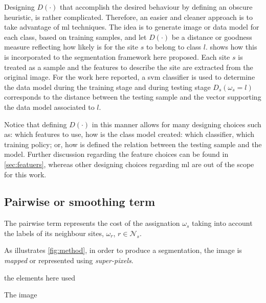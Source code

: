 Designing $D(\cdot)$ that accomplish the desired behaviour by defining an obscure heuristic, is rather complicated. 
Therefore, an easier and cleaner approach is to take advantage of \ac{ml} techniques. 
The idea is to generate image or data model for each class, based on training samples, and let $D(\cdot)$ be a distance or goodness measure reflecting how likely is for the site $s$ to belong to class $l$.
 shows how this is incorporated to the segmentation framework here proposed.
Each site $s$ is treated as a sample and the features to describe the site are extracted from the original image. 
For the work here reported, a \ac{svm} classifier is used to determine the data model during the training stage and during testing stage $D_s(\omega_s=l)$ corresponds to the distance between the testing sample and the vector supporting the data model associated to $l$. 

Notice that defining $D(\cdot)$ in this manner allows for many designing choices such as: which features to use, how is the class model created: which classifier, which training policy; or, how is defined the relation between the testing sample and the model.
Further discussion regarding the feature choices can be found in \cref{sec:featuers}, whereas other designing choices regarding \ac{ml} are out of the scope for this work.

\subsection{Pairwise or smoothing term} \label{sec:method:mrfTerm}
 
The pairwise term represents the cost of the assignation $\omega_s$ taking into account the labels of its neighbour sites, $\omega_r$, $r \in \mathcal{N}_{s}$. 

As illustrates \cref{fig:method}, in order to produce a segmentation, the image is \emph{mapped} or represented using \emph{super-pixels}. 

the elements here used 

 The image 
%
%
%
%

